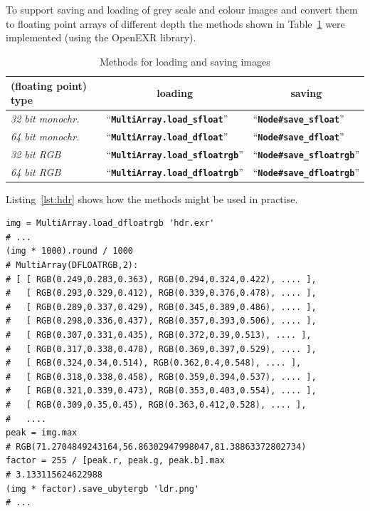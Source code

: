 \documentclass[12pt,a4paper,oneside,openright]{book}
\newcommand{\tbl}[1]{Table~\ref{tbl:#1}}
\newcommand{\lst}[1]{Listing~\ref{lst:#1}}
\newcommand{\code}[1]{``\texttt{\textbf{\textcolor{codegray}{\small{#1}}}}''}
\begin{document}
\begin{CJK}{UTF8}{}
To support saving and loading of grey scale and colour images and convert them to floating point arrays of different depth the methods shown in \tbl{openexr} were implemented (using the OpenEXR library).
\begin{table}[htbp]
  \begin{center}
    \caption{Methods for loading and saving images\label{tbl:openexr}}\vspace{1em}
    \begin{tabular}{lll}\toprule
      \textbf{(floating point) type} & \multicolumn{1}{c}{\textbf{loading}} & \multicolumn{1}{c}{\textbf{saving}}\\\midrule
      \emph{32 bit monochr.} & \code{MultiArray.load\_sfloat} & \code{Node\#save\_sfloat}\\
      \emph{64 bit monochr.} & \code{MultiArray.load\_dfloat} & \code{Node\#save\_dfloat}\\\midrule
      \emph{32 bit \acs{RGB}}      & \code{MultiArray.load\_sfloatrgb} & \code{Node\#save\_sfloatrgb}\\
      \emph{64 bit \acs{RGB}}      & \code{MultiArray.load\_dfloatrgb} & \code{Node\#save\_dfloatrgb}\\\bottomrule
    \end{tabular}
  \end{center}
\end{table}
\lst{hdr} shows how the methods might be used in practise.
\lstset{language=Ruby,frame=single,numbers=none}
\begin{lstlisting}[float,caption={Converting an \acs{HDR} image to an \acs{LDR} image (no tone mapping)},label=lst:hdr]
img = MultiArray.load_dfloatrgb 'hdr.exr'
# ...
(img * 1000).round / 1000
# MultiArray(DFLOATRGB,2):
# [ [ RGB(0.249,0.283,0.363), RGB(0.294,0.324,0.422), .... ],
#   [ RGB(0.293,0.329,0.412), RGB(0.339,0.376,0.478), .... ],
#   [ RGB(0.289,0.337,0.429), RGB(0.345,0.389,0.486), .... ],
#   [ RGB(0.298,0.336,0.437), RGB(0.357,0.393,0.506), .... ],
#   [ RGB(0.307,0.331,0.435), RGB(0.372,0.39,0.513), .... ],
#   [ RGB(0.317,0.338,0.478), RGB(0.369,0.397,0.529), .... ],
#   [ RGB(0.324,0.34,0.514), RGB(0.362,0.4,0.548), .... ],
#   [ RGB(0.318,0.338,0.458), RGB(0.359,0.394,0.537), .... ],
#   [ RGB(0.321,0.339,0.473), RGB(0.353,0.403,0.554), .... ],
#   [ RGB(0.309,0.35,0.45), RGB(0.363,0.412,0.528), .... ],
#   ....
peak = img.max
# RGB(71.2704849243164,56.86302947998047,81.38863372802734)
factor = 255 / [peak.r, peak.g, peak.b].max
# 3.133115624622988
(img * factor).save_ubytergb 'ldr.png'
# ...
\end{lstlisting}


\end{CJK}
\end{document}
